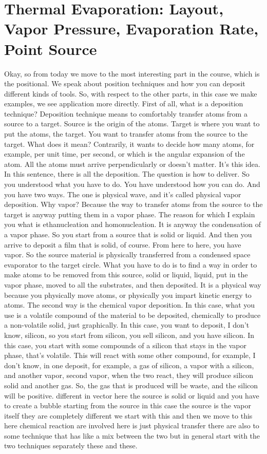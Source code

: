 \chapter{Thermal Evaporation: Layout, Vapor Pressure, Evaporation Rate, Point Source}
Okay, so from today we move to the most interesting part in the course, which is the positional. We speak about position techniques and how you can deposit different kinds of tools. So, with respect to the other parts, in this case we make examples, we see application more directly. First of all, what is a deposition technique? Deposition technique means to comfortably transfer atoms from a source to a target. Source is the origin of the atoms. Target is where you want to put the atoms, the target. You want to transfer atoms from the source to the target. What does it mean? Contrarily, it wants to decide how many atoms, for example, per unit time, per second, or which is the angular expansion of the atom. All the atoms must arrive perpendicularly or doesn't matter. It's this idea. In this sentence, there is all the deposition. The question is how to deliver. So you understood what you have to do. You have understood how you can do. And you have two ways. The one is physical wave, and it's called physical vapor deposition. Why vapor? Because the way to transfer atoms from the source to the target is anyway putting them in a vapor phase. The reason for which I explain you what is ethanucleation and homonucleation. It is anyway the condensation of a vapor phase. So you start from a source that is solid or liquid. And then you arrive to deposit a film that is solid, of course. From here to here, you have vapor. So the source material is physically transferred from a condensed space evaporator to the target circle. What you have to do is to find a way in order to make atoms to be removed from this source, solid or liquid, liquid, put in the vapor phase, moved to all the substrates, and then deposited. It is a physical way because you physically move atoms, or physically you impart kinetic energy to atoms. The second way is the chemical vapor deposition. In this case, what you use is a volatile compound of the material to be deposited, chemically to produce a non-volatile solid, just graphically. In this case, you want to deposit, I don't know, silicon, so you start from silicon, you sell silicon, and you have silicon. In this case, you start with some compounds of a silicon that stays in the vapor phase, that's volatile. This will react with some other compound, for example, I don't know, in one deposit, for example, a gas of silicon, a vapor with a silicon, and another vapor, second vapor, when the two react, they will produce silicon solid and another gas. So, the gas that is produced will be waste, and the silicon will be positive. different in vector here the source is solid or liquid and you have to create a bubble starting from the source in this case the source is the vapor itself they are completely different we start with this and then we move to this here chemical reaction are involved here is just physical transfer there are also to some technique that has like a mix between the two but in general start with the two techniques separately these and these.
